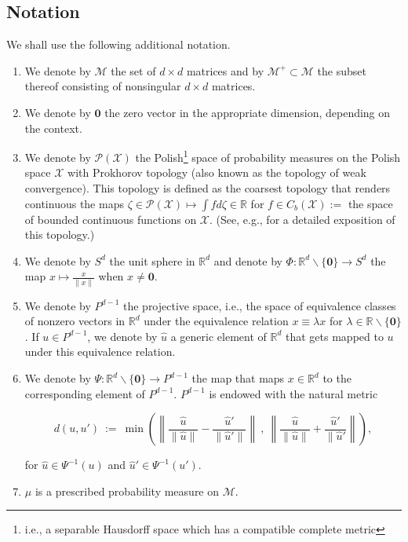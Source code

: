 \documentclass[12pt]{amsart}
\theoremstyle{plain}
\theoremstyle{definition}
\theoremstyle{remark}
\newcommand{\R}{\mathbb{R}}
\newcommand{\M}{\mathcal{M}}
\newcommand{\PA}{\mathcal{P}}
\newcommand{\X}{\mathcal{X}}
\newcommand{\0}{\textbf{0}}
\begin{document}
 \subsection{Notation}

 
 We shall use the following additional notation.\\
 
 \begin{enumerate}

\item We denote by $\M$ the set of $d\times d$ matrices and by $\M^+ \subset \M$ the subset thereof consisting of nonsingular $d\times d$ matrices. \\

\item We denote by $\0$ the zero vector in the appropriate dimension, depending on the context.\\

\item We denote by $\PA(\X)$ the Polish\footnote{i.e., a separable Hausdorff space which has a compatible complete metric} space of probability measures on the Polish space $\X$ with Prokhorov topology (also known as the topology of weak convergence). This topology is defined as the coarsest topology that renders continuous the maps $\zeta \in \PA(\X) \mapsto \int fd\zeta\in \R$ for $f \in C_b(\X) :=$ the space of bounded continuous functions on $\X$. (See, e.g., \cite{Bill} for a detailed exposition of this topology.)\\

\item We denote by $S^d$ the unit sphere in $\R^d$ and denote by $\Phi : \R^d\backslash\{\0\} \to S^d$ the map $x \mapsto \frac{x}{\|x\|}$ when $x \neq \0$.\\

\item We denote by $P^{d-1}$ the projective space, i.e., the space of  equivalence classes of nonzero vectors in $\R^d$ under the equivalence relation $x \equiv \lambda x$ for $\lambda \in \R\backslash\{\0\}$. If $u \in P^{d-1}$, we denote by $\hat{u}$ a generic element of $\R^d$ that gets mapped to $u$ under this equivalence relation. \\

\item We denote by $\Psi : \R^d\backslash\{\0\}  \to P^{d-1}$ the map that maps $x \in \R^d$ to the corresponding element of $P^{d-1}$. $P^{d-1}$ is endowed with the natural metric 

$$d(u,u') \ := \ \min\left(\left\|\frac{\hat{u}}{\|\hat{u}\|}-\frac{\hat{u}'}{\|\hat{u}'\|}\right\| \ , \ \left\|\frac{\hat{u}}{\|\hat{u}\|}+\frac{\hat{u}'}{\|\hat{u}'}\right\|\right),$$

\medskip

for $\hat{u}\in \Psi^{-1}(u)$ and $\hat{u}' \in \Psi^{-1}(u')$.\\

\item $\mu$ is a prescribed probability measure on $\M$.

\end{enumerate}
\end{document}
